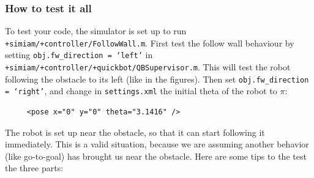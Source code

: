 \documentclass[10pt]{article}
\begin{document}
\subsubsection*{How to test it all}

To test your code, the simulator is set up to run \texttt{+simiam/+controller/FollowWall.m}. First test the follow wall behaviour by setting \texttt{obj.fw\_direction = `left'} in \texttt{+simiam/+controller/+quickbot/}\texttt{QBSupervisor.m}. This will test the robot following the obstacle to its left (like in the figures). Then set \texttt{obj.fw\_direction = `right'}, and change in \texttt{settings.xml} the initial theta of the robot to $\pi$:
\begin{verbatim}
     <pose x="0" y="0" theta="3.1416" />
\end{verbatim}
The robot is set up near the obstacle, so that it can start following it immediately. This is a valid situation, because we are assuming another behavior (like go-to-goal) has brought us near the obstacle. Here are some tips to the test the three parts:
\end{document}
